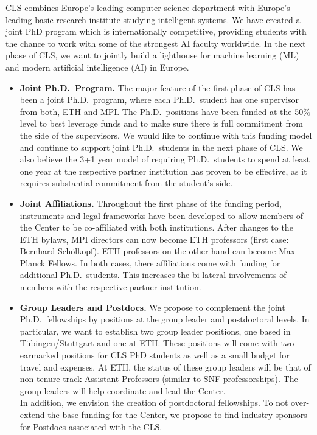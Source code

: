\documentclass{article}
\begin{document}
CLS combines Europe's leading computer science department with Europe's leading basic research institute studying intelligent systems. We have created a joint PhD program which is internationally competitive, providing students with the chance to work with some of the strongest AI faculty worldwide. In the next phase of CLS, we want to jointly build a lighthouse for machine learning (ML) and modern artificial intelligence (AI) in Europe.

\begin{itemize} 
\item \textbf{Joint Ph.D.~Program.}
The major feature of the first phase of CLS has been a joint Ph.D.~program, where each Ph.D.~student has one supervisor from both, ETH and MPI. The Ph.D.~positions have been funded at the 50\% level  to best leverage funds and to make sure there is full commitment from the side of the supervisors. We would like to continue with this funding model and continue to support joint Ph.D.~students in the next phase of CLS. We also believe the 3+1 year model of requiring Ph.D.~students to spend at least one year at the respective partner institution has proven to be effective, as it requires substantial commitment from the student's side. 
%
\item \textbf{Joint Affiliations.} Throughout the first phase of the funding period, instruments and legal frameworks have been developed to allow members of the Center to be co-affiliated with both institutions. After changes to the ETH bylaws, MPI directors can now become ETH professors (first case: Bernhard Sch\"olkopf). ETH professors on the other hand can become Max Planck Fellows. In both cases, there affiliations come with funding for additional Ph.D.~students. This increases the bi-lateral involvements of members with the respective partner institution. 
%
\item \textbf{Group Leaders and Postdocs.}  We propose to complement the joint Ph.D.~fellowships by positions at the group leader and postdoctoral levels. In particular, we want to establish two group leader positions, one based in T\"ubingen/Stuttgart and one at ETH. These positions will come with two earmarked positions for CLS PhD students as well as a small budget for travel and expenses. At ETH, the status of these group leaders will be that of non-tenure track Assistant Professors (similar to SNF professorships). The group leaders will help coordinate and lead the Center. \\[2mm] In addition, we envision the creation of postdoctoral fellowships. To not over-extend the base funding for the Center, we propose to find industry sponsors for Postdocs associated with the CLS.

\end{itemize}
\end{document}
